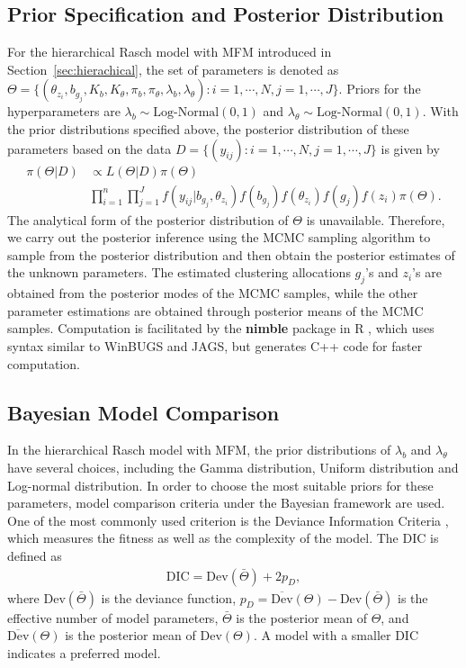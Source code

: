 \documentclass[12pt]{article}
\begin{document}
\subsection{Prior Specification and Posterior Distribution}
For the hierarchical Rasch model with MFM introduced in Section~\ref{sec:hierachical}, the set of parameters is denoted as $\Theta =\{(\theta_{z_i}, b_{g_j}, K_b, K_\theta, \pi_b, \pi_\theta,  \lambda_b, \lambda_{\theta}): i = 1, \cdots, N, j = 1, \cdots, J\}$. Priors for the hyperparameters are $\lambda_b \sim \text{Log-Normal}(0,1)$ and $\lambda_{\theta} \sim \text{Log-Normal}(0,1)$. With the prior distributions specified above, the posterior distribution of these parameters based on the data $D = \{(y_{ij}): i = 1,\cdots, N, j = 1, \cdots, J\}$ is given by
\begin{align*}
	\pi(\Theta|D) &\propto L(\Theta|D) \pi(\Theta)\\
	& \prod_{i=1}^{n} \prod_{j=1}^{J} f(y_{ij}|b_{g_j}, \theta_{z_i}) f(b_{g_j})f(\theta_{z_i})f(g_j)f(z_i) \pi(\Theta).
\end{align*}
The analytical form of the posterior distribution of $\Theta$ is unavailable. Therefore, we carry out the posterior inference using the MCMC sampling algorithm to sample from the posterior distribution and then obtain the posterior estimates of the unknown parameters. The estimated clustering allocations $g_j$'s and $z_i$'s are obtained from the posterior modes of the MCMC samples, while the other parameter estimations are obtained through posterior means of the MCMC samples. Computation is facilitated by the \textbf{nimble}\citep{de2017programming} package in \textsf{R} \citep{Rlanguage2013}, which uses syntax similar to \textsf{WinBUGS} \citep{lunn2000winbugs} and \textsf{JAGS}\citep{plummer2003jags}, but generates \textsf{C++} code for faster computation.
 

\subsection{Bayesian Model Comparison}
In the hierarchical Rasch model with MFM, the prior distributions of $\lambda_b$ and $\lambda_{\theta}$ have several choices, including the Gamma distribution, Uniform distribution and Log-normal distribution. In order to choose the most suitable priors for these parameters, model comparison criteria under the Bayesian framework are used. One of the most commonly used criterion is the Deviance Information Criteria \citep[DIC;][]{spiegelhalter2002bayesian}, which measures the fitness as well as the complexity of the model. The DIC is defined as 
\begin{gather}
	\text{DIC}=\text{Dev}(\bar{\Theta})+2p_D,
\end{gather}
where $\text{Dev}(\bar{\Theta})$ is the deviance function,
$p_D=\overline{\text{Dev}}({\Theta})-\text{Dev}(\bar{\Theta})$ is the effective
number of model parameters, $\bar{\Theta}$ is the posterior mean of $\Theta$, and $\overline{\text{Dev}}({\Theta})$ is the posterior mean of $\text{Dev}(\Theta)$. A model with a smaller DIC indicates a preferred model.
\end{document}
